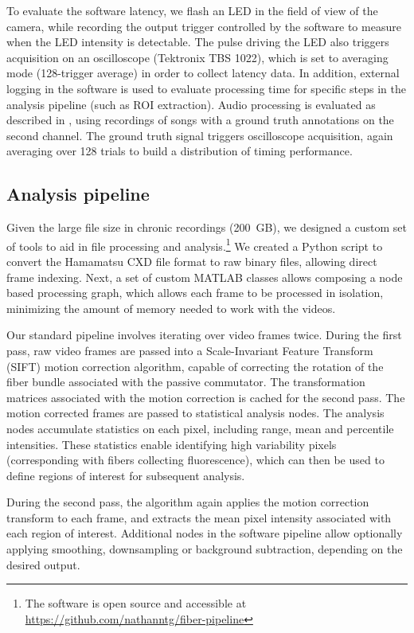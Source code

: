 To evaluate the software latency, we flash an LED in the 
field of view of the camera, while recording the output trigger 
controlled by the software to measure when the LED intensity is 
detectable. The pulse driving the LED also triggers acquisition on an 
oscilloscope (Tektronix TBS 1022), which is set to averaging mode (128-trigger average) 
in order to collect latency data. In addition, external logging
in the software is used to evaluate processing time for 
specific steps in the analysis pipeline (such as ROI extraction).
Audio processing is evaluated as described in \cite{Pearre:2017cs},
using recordings of songs with a ground truth annotations on the 
second channel. The ground truth signal triggers oscilloscope 
acquisition, again averaging over 128 trials to build a distribution 
of timing performance.

\subsection{Analysis pipeline}
\label{sec:pipeline}

Given the large file size in chronic recordings (200~GB), 
we designed a custom set of tools to aid in file 
processing and analysis.\footnote{The software is open 
source and accessible at 
\url{https://github.com/nathanntg/fiber-pipeline}} 
We created a Python script to 
convert the Hamamatsu CXD file format to raw binary files, 
allowing direct frame indexing. Next, a set of custom 
MATLAB classes allows composing a node based processing 
graph, which allows each frame to be processed in 
isolation, minimizing the amount of memory needed to work 
with the videos.

Our standard pipeline involves iterating over video frames 
twice. During the first pass, raw video frames are 
passed into a Scale-Invariant Feature Transform (SIFT) 
\cite{vedaldi08vlfeat,lowe1999object,Lowe:2004kp} 
motion correction algorithm, capable of correcting 
the rotation of the fiber bundle associated with the 
passive commutator. The transformation matrices 
associated with the motion correction is cached 
for the second pass. The motion corrected frames 
are passed to statistical analysis nodes. The analysis 
nodes accumulate statistics on each pixel, including 
range, mean and percentile intensities. These statistics 
enable identifying high variability pixels (corresponding 
with fibers collecting fluorescence), which can then 
be used to define regions of interest for subsequent 
analysis.

During the second pass, the algorithm again applies the 
motion correction transform to each frame, and extracts 
the mean pixel intensity associated with each region of 
interest. Additional nodes in the software pipeline allow 
optionally applying smoothing, downsampling or background 
subtraction, depending on the desired output.

